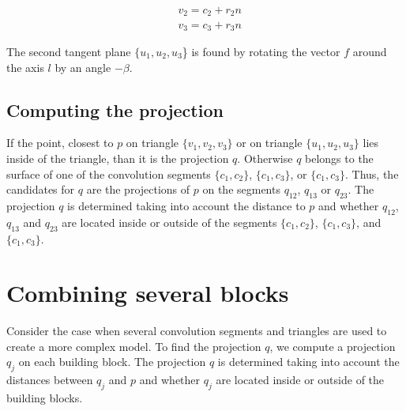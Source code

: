 \documentclass[10pt,journal,a4paper]{IEEEtran}
\begin{document}
\begin{align}
	& v_2 = c_2  + r_2 n \\
	& v_3 = c_3 + r_3 n 
\end{align}

The second tangent plane $\{u_1, u_2, u_3$\} is found by rotating the vector $f$ around the axis $l$ by an angle $-\beta$.



\subsection{Computing the projection}

If the point, closest to $p$ on triangle $\{v_1, v_2, v_3\}$ or on triangle $\{u_1, u_2, u_3\}$ lies inside of the triangle, than it is the projection $q$. Otherwise $q$ belongs to the surface of one of the convolution segments $\{c_1, c_2\}$,  $\{c_1, c_3\}$, or  $\{c_1, c_3\}$. Thus, the candidates for $q$ are the projections of $p$ on the segments $q_{12}$, $q_{13}$ or $q_{23}$. The projection $q$ is determined taking into account the distance to $p$ and whether  $q_{12}$, $q_{13}$ and $q_{23}$ are located inside or outside of the segments $\{c_1, c_2\}$,  $\{c_1, c_3\}$, and  $\{c_1, c_3\}$.  


\section{Combining several blocks}

Consider the case when several convolution segments and triangles are used to create a more complex model. To find the projection $q$, we compute a projection $q_j$ on each  building block.  The projection $q$ is determined taking into account the distances between $q_j$ and $p$ and whether  $q_j$ are located inside or outside of the building blocks.



%
%
\end{document}
